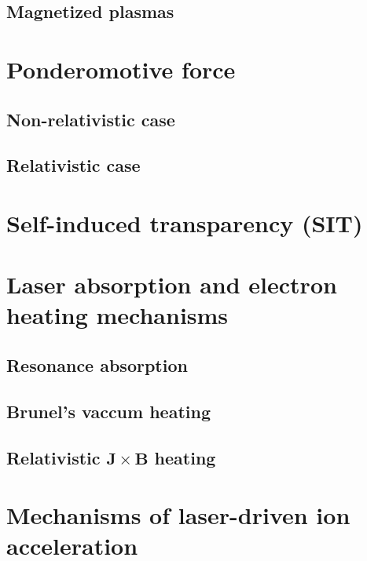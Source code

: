 \documentclass[12pt, twoside, a4paper, openright]{report}
\renewcommand{\vec}[1]{\mathbf{#1}}
\begin{document}
\subsection{Magnetized plasmas}


\section{Ponderomotive force}


\subsection{Non-relativistic case}


\subsection{Relativistic case}


\section{Self-induced transparency (SIT)}


\section{Laser absorption and electron heating mechanisms}


\subsection{Resonance absorption}


\subsection{Brunel's vaccum heating}


\subsection{Relativistic $ \vec{J} \times \vec{B} $ heating}


\section{Mechanisms of laser-driven ion acceleration}

\end{document}
